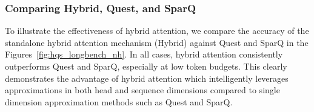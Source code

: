 \begin{figure*}[!t]
    \centering
    \hfill
    \hfill
    \hfill
    \hfill
    \caption{LongBench and \needle accuracy comparison among Hybrid, Quest, and SparQ.}
    \label{fig:hqs_longbench_nh}
\end{figure*}



\subsubsection{Comparing Hybrid, Quest, and SparQ}

To illustrate the effectiveness of hybrid attention, we compare the accuracy of the standalone hybrid attention mechanism (Hybrid) against Quest and SparQ in the Figures~\ref{fig:hqs_longbench_nh}. In all cases, hybrid attention consistently outperforms Quest and SparQ, especially at low token budgets. This clearly demonstrates the advantage of hybrid attention which intelligently leverages approximations in both head and sequence dimensions compared to single dimension approximation methods such as Quest and SparQ.
 












 
